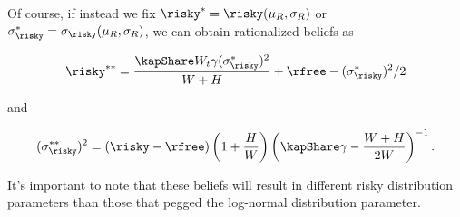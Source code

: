 \documentclass[PortfolioChoiceWithRiskyHousing]{subfiles}
\begin{document}
Of course, if instead we fix $\risky^* =\risky(\mu_R, \sigma_R)$ or $\sigma_\risky^* = \sigma_\risky(\mu_R, \sigma_R)$, we can obtain rationalized beliefs as

\begin{equation}
	\risky^{**} = \frac{\kapShare W_{t} \gamma (\sigma_\risky^*)^2}{W + H} + \rfree - (\sigma_\risky^*)^2/2
\end{equation}

and

\begin{equation}
	(\sigma_\risky^{**})^2 = (\risky-\rfree)\left( 1 + \frac{H}{W}\right) \left(\kapShare \gamma - \frac{W + H }{2W}\right)^{-1}.
\end{equation}

It's important to note that these beliefs will result in different risky distribution parameters than those that pegged the log-normal distribution parameter.
\end{document}
